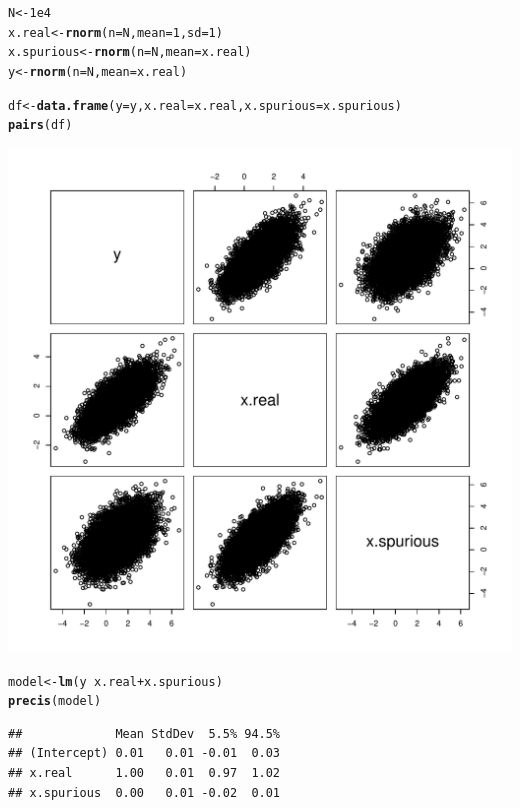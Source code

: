 \documentclass[12pt]{article}\usepackage[]{graphicx}\usepackage[]{color}
\makeatletter
\def\maxwidth{ %
  \ifdim\Gin@nat@width>\linewidth
    \linewidth
  \else
    \Gin@nat@width
  \fi
}
\newcommand{\hlnum}[1]{\textcolor[rgb]{0.686,0.059,0.569}{#1}}%
\newcommand{\hlopt}[1]{\textcolor[rgb]{0,0,0}{#1}}%
\newcommand{\hlstd}[1]{\textcolor[rgb]{0.345,0.345,0.345}{#1}}%
\newcommand{\hlkwb}[1]{\textcolor[rgb]{0.69,0.353,0.396}{#1}}%
\newcommand{\hlkwc}[1]{\textcolor[rgb]{0.333,0.667,0.333}{#1}}%
\newcommand{\hlkwd}[1]{\textcolor[rgb]{0.737,0.353,0.396}{\textbf{#1}}}%
\newenvironment{kframe}{%
 \def\at@end@of@kframe{}%
 \ifinner\ifhmode%
  \def\at@end@of@kframe{\end{minipage}}%
  \begin{minipage}{\columnwidth}%
 \fi\fi%
 \def\FrameCommand##1{\hskip\@totalleftmargin \hskip-\fboxsep
 \colorbox{shadecolor}{##1}\hskip-\fboxsep
     \hskip-\linewidth \hskip-\@totalleftmargin \hskip\columnwidth}%
 \MakeFramed {\advance\hsize-\width
   \@totalleftmargin\z@ \linewidth\hsize
   \@setminipage}}%
 {\par\unskip\endMakeFramed%
 \at@end@of@kframe}
\newenvironment{knitrout}{}{} %
\makeatother
\begin{document}
\begin{knitrout}
\color{fgcolor}\begin{kframe}
\begin{alltt}
\hlstd{N} \hlkwb{<-} \hlnum{1e4}
\hlstd{x.real} \hlkwb{<-} \hlkwd{rnorm}\hlstd{(}\hlkwc{n} \hlstd{= N,} \hlkwc{mean} \hlstd{=} \hlnum{1}\hlstd{,} \hlkwc{sd} \hlstd{=} \hlnum{1}\hlstd{)}
\hlstd{x.spurious} \hlkwb{<-} \hlkwd{rnorm}\hlstd{(}\hlkwc{n} \hlstd{= N,} \hlkwc{mean} \hlstd{= x.real)}
\hlstd{y} \hlkwb{<-} \hlkwd{rnorm}\hlstd{(}\hlkwc{n} \hlstd{= N,} \hlkwc{mean} \hlstd{= x.real)}

\hlstd{df} \hlkwb{<-} \hlkwd{data.frame}\hlstd{(}\hlkwc{y} \hlstd{= y,} \hlkwc{x.real} \hlstd{= x.real,} \hlkwc{x.spurious} \hlstd{= x.spurious)}
\hlkwd{pairs}\hlstd{(df)}
\end{alltt}
\end{kframe}
\includegraphics[width=\maxwidth]{figure/unnamed-chunk-2-1} 
\begin{kframe}\begin{alltt}
\hlstd{model} \hlkwb{<-} \hlkwd{lm}\hlstd{(y} \hlopt{~} \hlstd{x.real} \hlopt{+} \hlstd{x.spurious)}
\hlkwd{precis}\hlstd{(model)}
\end{alltt}
\begin{verbatim}
##             Mean StdDev  5.5% 94.5%
## (Intercept) 0.01   0.01 -0.01  0.03
## x.real      1.00   0.01  0.97  1.02
## x.spurious  0.00   0.01 -0.02  0.01
\end{verbatim}
\end{kframe}
\end{knitrout}
\end{document}
